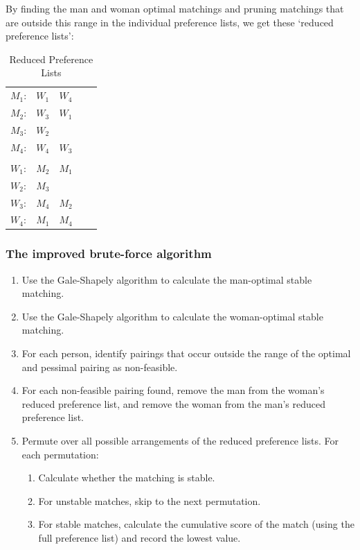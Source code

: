 \documentclass[a4paper]{article}
\begin{document}
By finding the man and woman optimal matchings and pruning matchings that are outside this range in the individual preference lists, we get these `reduced preference lists':

\begin{table}[H]
\centering
\caption{Reduced Preference Lists}
\begin{tabular}{lllll}
$M_1$: & $W_1$ & $W_4$ & &       \\
$M_2$: & $W_3$ & $W_1$ \\
$M_3$: & $W_2$ & & &          \\
$M_4$: & $W_4$ & $W_3$ & &       \\
                        \\
$W_1$: & $M_2$ & $M_1$ &    \\
$W_2$: & $M_3$ & & &          \\
$W_3$: & $M_4$ & $M_2$ & &       \\
$W_4$: & $M_1$ & $M_4$ & &       \\
\end{tabular}
\end{table}

\subsubsection{The improved brute-force algorithm}
\begin{enumerate}
    \item Use the Gale-Shapely algorithm to calculate the man-optimal stable matching.
    
    \item Use the Gale-Shapely algorithm to calculate the woman-optimal stable matching.
    
    \item For each person, identify pairings that occur outside the range of the optimal and pessimal pairing as non-feasible.
    
    \item For each non-feasible pairing found, remove the man from the woman's reduced preference list, and remove the woman from the man's reduced preference list.
    
    \item Permute over all possible arrangements of the reduced preference lists. For each permutation:
    \begin{enumerate}
        \item Calculate whether the matching is stable.
        \item For unstable matches, skip to the next permutation.
        \item For stable matches, calculate the cumulative score of the match (using the full preference list) and record the lowest value.
    \end{enumerate}

\end{enumerate}
\end{document}
